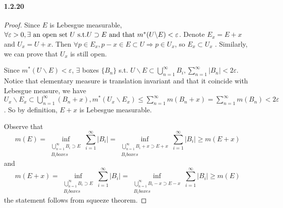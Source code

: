 \documentclass{article}
\begin{document}
\paragraph{1.2.20}
\begin{proof}
Since $E$ is Lebesgue measurable, $\forall\varepsilon>0, \exists \text{ an open set }U\text{ s.t.} U\supset E \text{ and that } m^*(U\backslash E)<\varepsilon$. 
Denote $E_x=E+x$ and $U_x=U+x$. Then $\forall p\in E_x, p-x\in E\subset U \Rightarrow p\in U_x$, so $E_x\subset U_x$ . Similarly, we can prove that $U_x$ is still open.

Since $m^*(U\backslash E)<\varepsilon$, $\exists$ boxes $\{B_n\}$ s.t. $U\backslash E\subset\bigcup\limits_{n=1}^{\infty}B_i, \sum_{n=1}^{\infty} |B_n|<2\varepsilon$. Notice that elementary measure is translation invariant and that it coincide with Lebesgue measure, we have $U_x\backslash E_x\subset \bigcup\limits_{n=1}^{\infty}(B_n+x), m^*(U_x\backslash E_x)\leq\sum\limits_{n=1}^{\infty}m(B_n+x)=\sum\limits_{n=1}^{\infty}m(B_n)<2\varepsilon$. So by definition, $E+x$ is Lebesgue measurable.

Observe that \[m(E)=\inf\limits_{\substack{\bigcup_{n=1}^{\infty}B_i\supset E\\B_i boxes}}\sum_{i=1}^{\infty}|B_i|=\inf\limits_{\substack{\bigcup_{n=1}^{\infty}B_i+x\supset E+x\\B_i boxes}}\sum_{i=1}^{\infty}|B_i|\geq m(E+x)\] and \[m(E+x)=\inf\limits_{\substack{\bigcup_{n=1}^{\infty}B_i\supset E\\B_i boxes}}\sum_{i=1}^{\infty}|B_i|=\inf\limits_{\substack{\bigcup_{n=1}^{\infty}B_i-x\supset E-x\\B_i boxes}}\sum_{i=1}^{\infty}|B_i|\geq m(E)\] the statement follows from squeeze theorem.
\end{proof}
\end{document}
